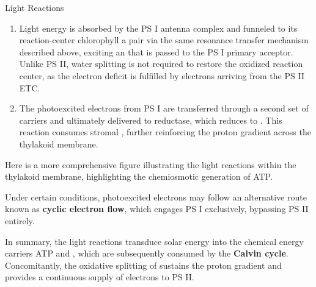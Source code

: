 \documentclass[10pt]{article}
\begin{document}
\begin{core}{Light Reactions}
\begin{enumerate}[label=(\arabic*)]
        \item Light energy is absorbed by the PS I antenna complex and funneled to its reaction-center chlorophyll a pair via the same resonance transfer mechanism described above, exciting an  that is passed to the PS I primary acceptor. Unlike PS II, water splitting is not required to restore the oxidized reaction center, as the electron deficit is fulfilled by electrons arriving from the PS II ETC.

        \item The photoexcited electrons from PS I are transferred through a second set of  carriers and ultimately delivered to  reductase, which reduces  to . This reaction consumes stromal , further reinforcing the proton gradient across the thylakoid membrane.

      \end{enumerate}

      Here is a more comprehensive figure illustrating the light reactions within the thylakoid membrane, highlighting the chemiosmotic generation of ATP.


      Under certain conditions, photoexcited electrons may follow an alternative route known as \textbf{cyclic electron flow}, which engages PS I exclusively, bypassing PS II entirely.


      In summary, the light reactions transduce solar energy into the chemical energy carriers ATP and , which are subsequently consumed by the \textbf{Calvin cycle}. Concomitantly, the oxidative splitting of  sustains the proton gradient and provides a continuous supply of electrons to PS II.

    \end{core}
\end{document}
